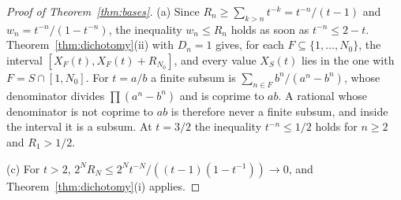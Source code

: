 \documentclass[11pt]{article}
\begin{document}
\begin{proof}[Proof of Theorem~\ref{thm:bases}]
(a) Since $R_n\ge\sum_{k>n}t^{-k}=t^{-n}/(t-1)$ and
$w_n=t^{-n}/(1-t^{-n})$, the inequality $w_n\le R_n$ holds as soon as
$t^{-n}\le2-t$.  Theorem~\ref{thm:dichotomy}(ii) with $D_n=1$ gives, for
each $F\subseteq\{1,\dots,N_0\}$, the interval $[X_F(t),X_F(t)+R_{N_0}]$, and every
value $X_S(t)$ lies in the one with $F=S\cap[1,N_0]$.  For $t=a/b$ a finite subsum is
$\sum_{n\in F}b^n/(a^n-b^n)$, whose denominator divides $\prod(a^n-b^n)$ and is
coprime to $ab$.  A rational whose denominator is not coprime to $ab$ is
therefore never a finite subsum, and inside the interval it is a subsum.  At
$t=3/2$ the inequality $t^{-n}\le1/2$ holds for $n\ge2$ and $R_1>1/2$.

(c) For $t>2$, $2^NR_N\le2^Nt^{-N}/((t-1)(1-t^{-1}))\to0$, and
Theorem~\ref{thm:dichotomy}(i) applies.
\end{proof}
\end{document}
